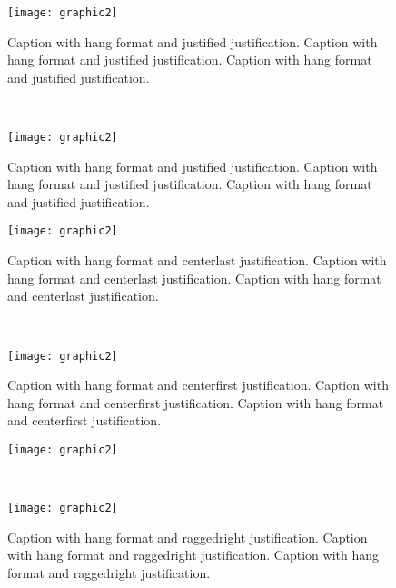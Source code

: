 \begin{figure}[tp]
	\centering
	\begin{minipage}{0.45\linewidth}
		\texttt{[image: graphic2]}
		\captionsetup{format=hang,indention=0pt,justification=justified}
		\caption{Caption with hang format and justified justification.
			Caption with hang format and justified justification.
			Caption with hang format and justified justification.}
		\label{fig:caption-format-ex3-justified}
	\end{minipage}\\[1em]
	\begin{minipage}{0.45\linewidth}
		\texttt{[image: graphic2]}
		\captionsetup{format=hang,indention=0pt,justification=justified}
		\caption{Caption with hang format and justified justification.
			Caption with hang format and justified justification.
			Caption with hang format and justified justification.}
		\label{fig:caption-format-ex3-centering}
	\end{minipage}\hfill
	\begin{minipage}{0.45\linewidth}
		\texttt{[image: graphic2]}
		\captionsetup{format=hang,indention=0pt,justification=centerlast}
		\caption{Caption with hang format and centerlast justification.
			Caption with hang format and centerlast justification.
			Caption with hang format and centerlast justification.}
		\label{fig:caption-format-ex3-centerlast}
	\end{minipage}\\[1em]
	\begin{minipage}{0.45\linewidth}
		\texttt{[image: graphic2]}
		\captionsetup{format=hang,indention=0pt,justification=centerfirst}
		\caption{Caption with hang format and centerfirst justification.
			Caption with hang format and centerfirst justification.
			Caption with hang format and centerfirst justification.}
		\label{fig:caption-format-ex3-centerfirst}
	\end{minipage}\hfill
	\begin{minipage}{0.45\linewidth}
		\texttt{[image: graphic2]}
		\captionsetup{format=hang,indention=0pt,justification=raggedright}
		\caption{Caption with hang format and raggedright justification.
			Caption with hang format and raggedright justification.
			Caption with hang format and raggedright justification.}
		\label{fig:caption-format-ex3-raggedright}
	\end{minipage}\\[1em]
	\begin{minipage}{0.45\linewidth}
		\texttt{[image: graphic2]}
		\captionsetup{format=hang,indention=0pt,justification=RaggedRight}

\end{minipage}
\end{figure}
